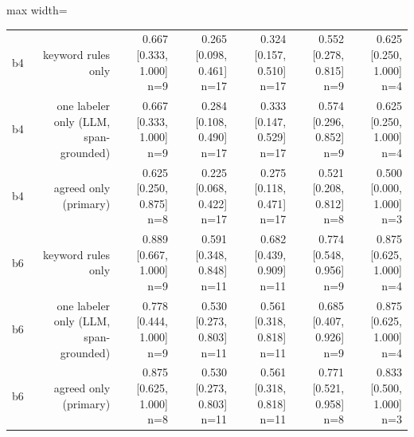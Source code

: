 \begin{table}[t]
\begin{adjustbox}{max width=\textwidth}
\begin{tabular}{lrrrrrr}
b4 & keyword rules only & 0.667 [0.333, 1.000] n=9 & 0.265 [0.098, 0.461] n=17 & 0.324 [0.157, 0.510] n=17 & 0.552 [0.278, 0.815] n=9 & 0.625 [0.250, 1.000] n=4 \\
b4 & one labeler only (LLM, span-grounded) & 0.667 [0.333, 1.000] n=9 & 0.284 [0.108, 0.490] n=17 & 0.333 [0.147, 0.529] n=17 & 0.574 [0.296, 0.852] n=9 & 0.625 [0.250, 1.000] n=4 \\
b4 & agreed only (primary) & 0.625 [0.250, 0.875] n=8 & 0.225 [0.068, 0.422] n=17 & 0.275 [0.118, 0.471] n=17 & 0.521 [0.208, 0.812] n=8 & 0.500 [0.000, 1.000] n=3 \\
b6 & keyword rules only & 0.889 [0.667, 1.000] n=9 & 0.591 [0.348, 0.848] n=11 & 0.682 [0.439, 0.909] n=11 & 0.774 [0.548, 0.956] n=9 & 0.875 [0.625, 1.000] n=4 \\
b6 & one labeler only (LLM, span-grounded) & 0.778 [0.444, 1.000] n=9 & 0.530 [0.273, 0.803] n=11 & 0.561 [0.318, 0.818] n=11 & 0.685 [0.407, 0.926] n=9 & 0.875 [0.625, 1.000] n=4 \\
b6 & agreed only (primary) & 0.875 [0.625, 1.000] n=8 & 0.530 [0.273, 0.803] n=11 & 0.561 [0.318, 0.818] n=11 & 0.771 [0.521, 0.958] n=8 & 0.833 [0.500, 1.000] n=3 \\
\bottomrule
\end{tabular}
\end{adjustbox}
\end{table}
